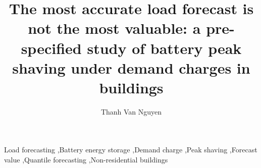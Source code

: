 \documentclass[preprint,12pt]{elsarticle}
\begin{document}
\begin{frontmatter}

\title{The most accurate load forecast is not the most valuable: a pre-specified study of battery peak shaving under demand charges in  buildings}

\ifdefined\ANON\else
\author[tsg]{Thanh Van Nguyen}
\fi

\begin{abstract}

\end{abstract}

\begin{keyword}
Load forecasting \sep Battery energy storage \sep Demand charge \sep Peak shaving \sep Forecast value \sep Quantile forecasting \sep Non-residential buildings
\end{keyword}

\end{frontmatter}













\end{document}
